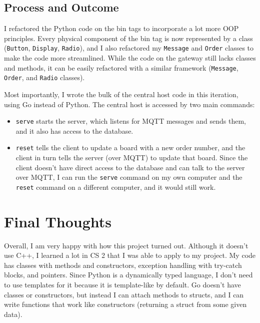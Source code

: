 \documentclass{article}
\begin{document}
\subsection{Process and Outcome}\label{process-and-outcome-3}

I refactored the Python code on the bin tags to incorporate a lot more
OOP principles. Every physical component of the bin tag is now
represented by a class (\texttt{Button}, \texttt{Display},
\texttt{Radio}), and I also refactored my \texttt{Message} and
\texttt{Order} classes to make the code more streamlined. While the code
on the gateway still lacks classes and methods, it can be easily
refactored with a similar framework (\texttt{Message}, \texttt{Order},
and \texttt{Radio} classes).

Most importantly, I wrote the bulk of the central host code in this
iteration, using Go instead of Python. The central host is accessed by
two main commands:

\begin{itemize}
\item
  \texttt{serve} starts the server, which listens for MQTT messages and
  sends them, and it also has access to the database.
\item
  \texttt{reset} tells the client to update a board with a new order
  number, and the client in turn tells the server (over MQTT) to update
  that board. Since the client doesn't have direct access to the
  database and can talk to the server over MQTT, I can run the
  \texttt{serve} command on my own computer and the \texttt{reset}
  command on a different computer, and it would still work.
\end{itemize}

\section{Final Thoughts}\label{final-thoughts}

Overall, I am very happy with how this project turned out. Although it
doesn't use C++, I learned a lot in CS 2 that I was able to apply to my
project. My code has classes with methods and constructors, exception
handling with try-catch blocks, and pointers. Since Python is a
dynamically typed language, I don't need to use templates for it because
it is template-like by default. Go doesn't have classes or constructors,
but instead I can attach methods to structs, and I can write functions
that work like constructors (returning a struct from some given data).
\end{document}
